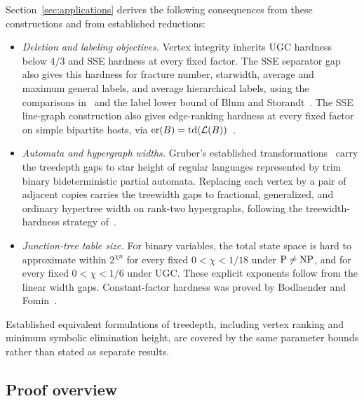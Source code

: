 Section~\ref{sec:applications} derives the following consequences
from these constructions and from established reductions:
\begin{itemize}
 \item \emph{Deletion and labeling objectives.} Vertex integrity
   inherits \textup{UGC} hardness below $4/3$ and \textup{SSE} hardness at every fixed
   factor. The \textup{SSE} separator gap also gives this hardness for fracture
   number, starwidth, average and maximum general labels, and average
    hierarchical labels, using the comparisons
   in~\cite{GimaEtAlIntegrity} and the label lower bound
   of Blum and Storandt~\cite{BlumStorandt2023}.
    The \textup{SSE} line-graph construction also gives edge-ranking hardness
    at every fixed factor on simple bipartite hosts, via
    $\operatorname{er}(B)=\operatorname{td}(\mathcal L(B))$~\cite{BodlaenderRankings}.
 \item \emph{Automata and hypergraph widths.} Gruber's established
   transformations~\cite{Gruber2008} carry the treedepth gaps to
   star height of regular languages represented by trim binary
   bideterministic partial automata. Replacing each vertex
   by a pair of adjacent copies carries the treewidth gaps to fractional, generalized,
   and ordinary hypertree width on rank-two hypergraphs, following
   the treewidth-hardness strategy of~\cite{Marx2010Fractional}.
 \item \emph{Junction-tree table size.} For binary variables, the
   total state space is hard to approximate within $2^{\chi n}$
   for every fixed $0<\chi<1/18$ under $\mathrm{P}\ne\mathrm{NP}$, and for
   every fixed $0<\chi<1/6$ under \textup{UGC}. These explicit exponents
   follow from the linear width gaps. Constant-factor hardness
   was proved by Bodlaender and Fomin~\cite{BodlaenderFomin2005}.
\end{itemize}
Established equivalent formulations of treedepth, including vertex
ranking and minimum symbolic elimination height, are covered by the
same parameter bounds rather than stated as separate results.

\subsection{Proof overview}


